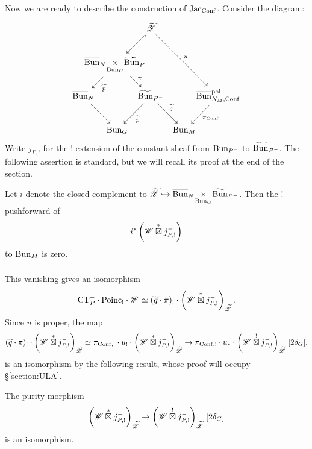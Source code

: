 \subsubsection{} Now we are ready to describe the construction of $\mathrm{Jac}_{\mathrm{Conf}}$. Consider the diagram:
\begin{equation}
\label{eqn:zastava_diagram}
\begin{tikzcd}[
  column sep={4em,between origins},
  row sep={4em,between origins}
]
  & & \ZZt \arrow[dl, hook] \arrow[ddrr, dashed, "u"] & & \\
  & \Bunc_N \! \underset{\Bun_G}{\times} \! \Bunt_{P^-} \arrow[dl, "\aph \widetilde{p}"] \arrow[dr, "\pi"] & & & \\
  \Bunc_N \arrow[dr] & & \Bunt_{P^-} \arrow[dl, "\widetilde{p}"] \arrow[dr, "\qt"] & & \Bunc_{N_M, \Conf}^\pol \arrow[dl, "\pi_\Conf"] \\ 
  & \Bun_G & & \Bun_M &
\end{tikzcd}
\end{equation}
Write $j_{P,!}$ for the $!$-extension of the constant sheaf from $\mathrm{Bun}_{P^-}$ to $\widetilde{\mathrm{Bun}}_{P^-}$. The following assertion is standard, but we will recall its proof at the end of the section.

\begin{proposition}
\label{proposition:zast_vanishing}
Let $i$ denote the closed complement to ${\widetilde{\mathscr{Z}}} \hookrightarrow \overline{\mathrm{Bun}}_N \! \underset{\mathrm{Bun}_G}{\times} \! \widetilde{\mathrm{Bun}}_{P^-}$. Then the $!$-pushforward of
  \[i^* \left( \mathscr{W} \overset{*}{\boxtimes} j_{P,!}^- \right)\]
to $\mathrm{Bun}_M$ is zero.
\end{proposition}

\subsubsection{} This vanishing gives an isomorphism
    \[
    \mathrm{CT}_P^- \cdot \mathrm{Poinc}_! \cdot \mathscr{W} 
    \simeq (\widetilde{q} \cdot \pi)_! \cdot \left( \mathscr{W} \overset{*}{\boxtimes} j_{P,!}^- \right)_{\widetilde{\mathscr{Z}}}.
    \]
Since $u$ is proper, the map
    \[
    (\widetilde{q} \cdot \pi)_! \cdot \left( \mathscr{W} \overset{*}{\boxtimes} j_{P,!}^- \right)_{\widetilde{\mathscr{Z}}}
    \simeq \pi_{\mathrm{Conf},!} \cdot u_! \cdot \left( \mathscr{W} \overset{*}{\boxtimes} j_{P,!}^- \right)_{\widetilde{\mathscr{Z}}}
    \to \pi_{\mathrm{Conf},!} \cdot u_* \cdot \left( \mathscr{W} \overset{!}{\boxtimes} j_{P,!}^- \right)_{\widetilde{\mathscr{Z}}} \, [2\delta_G].
    \]
is an isomorphism by the following result, whose proof will occupy \S\ref{section:ULA}.

\begin{lemma}
\label{lem:zast_ULA}
The purity morphism
    \[
    \left( \mathscr{W} \overset{*}{\boxtimes} j_{P,!}^- \right)_{\widetilde{\mathscr{Z}}} 
    \to \left( \mathscr{W} \overset{!}{\boxtimes} j_{P,!}^- \right)_{\widetilde{\mathscr{Z}}} \, [2 \delta_G]
    \]
is an isomorphism.
\end{lemma}

